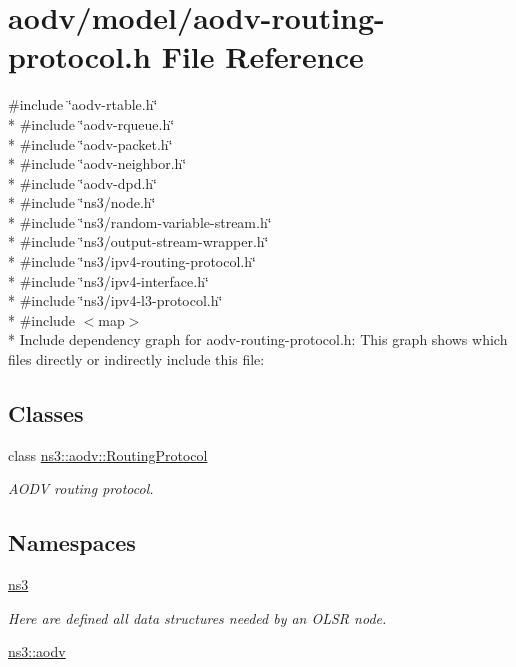 \hypertarget{aodv-routing-protocol_8h}{}\section{aodv/model/aodv-\/routing-\/protocol.h File Reference}
\label{aodv-routing-protocol_8h}
{\ttfamily \#include \char`\"{}aodv-\/rtable.\+h\char`\"{}}\\*
{\ttfamily \#include \char`\"{}aodv-\/rqueue.\+h\char`\"{}}\\*
{\ttfamily \#include \char`\"{}aodv-\/packet.\+h\char`\"{}}\\*
{\ttfamily \#include \char`\"{}aodv-\/neighbor.\+h\char`\"{}}\\*
{\ttfamily \#include \char`\"{}aodv-\/dpd.\+h\char`\"{}}\\*
{\ttfamily \#include \char`\"{}ns3/node.\+h\char`\"{}}\\*
{\ttfamily \#include \char`\"{}ns3/random-\/variable-\/stream.\+h\char`\"{}}\\*
{\ttfamily \#include \char`\"{}ns3/output-\/stream-\/wrapper.\+h\char`\"{}}\\*
{\ttfamily \#include \char`\"{}ns3/ipv4-\/routing-\/protocol.\+h\char`\"{}}\\*
{\ttfamily \#include \char`\"{}ns3/ipv4-\/interface.\+h\char`\"{}}\\*
{\ttfamily \#include \char`\"{}ns3/ipv4-\/l3-\/protocol.\+h\char`\"{}}\\*
{\ttfamily \#include $<$map$>$}\\*
Include dependency graph for aodv-\/routing-\/protocol.h\+:
This graph shows which files directly or indirectly include this file\+:
\subsection*{Classes}
\begin{DoxyCompactItemize}
\item 
class \hyperlink{classns3_1_1aodv_1_1RoutingProtocol}{ns3\+::aodv\+::\+Routing\+Protocol}
\begin{DoxyCompactList}\small\item\em A\+O\+DV routing protocol. \end{DoxyCompactList}\end{DoxyCompactItemize}
\subsection*{Namespaces}
\begin{DoxyCompactItemize}
\item 
 \hyperlink{namespacens3}{ns3}
\begin{DoxyCompactList}\small\item\em Here are defined all data structures needed by an O\+L\+SR node. \end{DoxyCompactList}\item 
 \hyperlink{namespacens3_1_1aodv}{ns3\+::aodv}
\end{DoxyCompactItemize}
